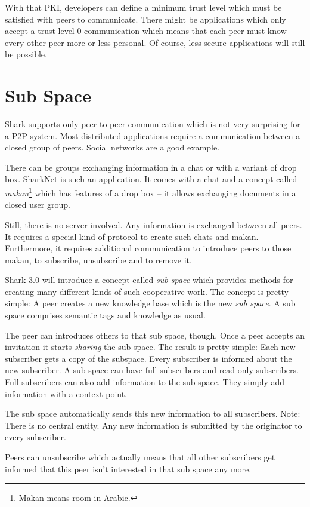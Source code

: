 With that PKI, developers can define a minimum trust level which must be satisfied with peers to communicate. There might be applications which only accept a trust level 0 communication which means that each peer must know every other peer more or less personal. Of course, less secure applications will still be possible.

\section{Sub Space}
Shark supports only peer-to-peer communication which is not very surprising for a P2P system. Most distributed applications require a communication between a closed group of peers. Social networks are a good example.

There can be groups exchanging information in a chat or with a variant of drop box. SharkNet is such an application. It comes with a chat and a concept called {\it makan}\footnote{Makan means room in Arabic.} which has features of a drop box -- it allows exchanging documents in a closed user group.

Still, there is no server involved. Any information is exchanged between all peers. It requires a special kind of protocol to create such chats and makan. Furthermore, it requires additional communication to introduce peers to those makan, to subscribe, unsubscribe and to remove it.

Shark 3.0 will introduce a concept called {\it sub space} which provides methods for creating many different kinds of such cooperative work. The concept is pretty simple: A peer creates a new knowledge base which is the new {\it sub space}. 
A sub space comprises semantic tags and knowledge as usual.

The peer can introduces others to that sub space, though. Once a peer accepts an invitation it starts {\it sharing} the sub space. The result is pretty simple: Each new subscriber gets a copy of the subspace. Every subscriber is informed about the new subscriber. A sub space can have full subscribers and read-only subscribers. Full subscribers can also add information to the sub space. They simply add information with a context point.

The sub space automatically sends this new information to all subscribers. Note: There is no central entity. Any new information is submitted by the originator to every subscriber. 

Peers can unsubscribe which actually means that all other subscribers get informed that this peer isn't interested in that sub space any more.

